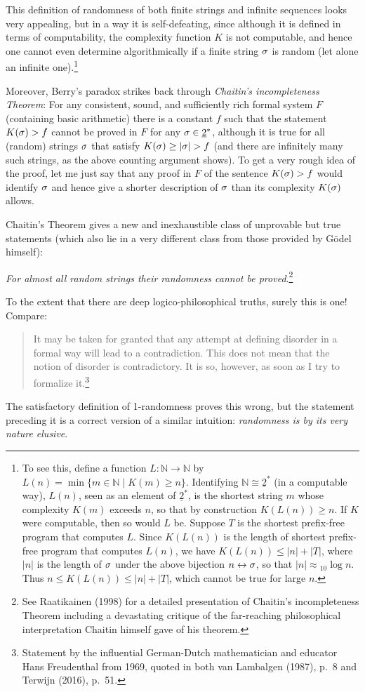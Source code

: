 \documentclass[11pt,a4paper]{article}
\numberwithin{equation}{section}
\newcommand{\ul}{\underline}
\newcommand{\raw}{\rightarrow}
\newcommand{\lraw}{\leftrightarrow}
\newcommand{\N}{{\mathbb N}} \newcommand{\R}{{\mathbb R}}
\begin{document}
This definition of randomness of both finite strings and infinite sequences looks very appealing, but in a way it is self-defeating, since although it is defined in terms of computability, the  complexity function $K$ is not computable, and hence one cannot even determine algorithmically if  a finite string $\sigma$ is random (let alone an infinite one).\footnote{To see this,  define a function $L:\N\raw\N$ by 
$L(n) = \min\{m\in\N \mid K(m) \geq n\}$. Identifying $\N\cong \ul{2}^*$ (in a computable way),
$L(n)$, seen as an element of $\ul{2}^*$,  is  the shortest string $m$ whose complexity $K(m)$ exceeds $n$, so that  by construction $K(L(n)) \geq n$.  If $K$ were  computable, then so would $L$ be. Suppose $T$ is the shortest prefix-free program  that computes $L$. 
Since $K(L(n))$ is the length of shortest prefix-free program that computes $L(n)$, we  have
  $K(L(n)) \leq |n| + |T|$, where $|n|$ is the length of $\sigma$ under the above bijection $n\lraw\sg$,
 so that $|n|\approx \mbox{}_{10}\!\log n$.
  Thus  $n\leq  K(L(n)) \leq |n| + |T|$, which cannot be true for large $n$.}
  
Moreover, Berry's paradox strikes back through \emph{Chaitin's incompleteness Theorem}: For any consistent, sound, and sufficiently rich formal system $F$ (containing basic arithmetic) there is a constant $f$ such that the statement $K(\sigma) > f$ cannot be proved in $F$ for any $\sg\in \ul{2}^*$, although it is true for  all (random)  strings $\sigma$ that satisfy $K(\sigma) \geq|\sigma| > f$ (and there are infinitely many such strings, as the above counting argument shows).
 To get a very rough idea of the proof, let me just say that 
any proof in $F$ of the sentence $K(\sigma) > f$  would  identify $\sigma$ and hence give a shorter description of $\sigma$ than its complexity $K(\sigma)$ allows.

Chaitin's Theorem gives a new and inexhaustible class of unprovable but true statements (which also lie in a very different class from those provided by G\"{o}del himself):
\begin{center}
\emph{For almost all random strings their randomness cannot be proved}.\footnote{See Raatikainen (1998) for a detailed presentation of Chaitin's incompleteness Theorem including a devastating critique of the far-reaching philosophical interpretation Chaitin himself gave of his theorem.}
\end{center}
To the extent that there are deep logico-philosophical truths, surely this is one! Compare: \begin{quote}\begin{small}
It may be taken for granted that any attempt at defining disorder in a formal way will lead to a contradiction. This does not mean that the notion of disorder is contradictory. It is so, however, as soon as I try to formalize it.\footnote{Statement by the influential German-Dutch mathematician and educator Hans Freudenthal from 1969, quoted in both van Lambalgen (1987), p.\ 8 and Terwijn (2016), p.\ 51.} 
\end{small}\end{quote}
The satisfactory definition of 1-randomness proves this wrong, but the  statement preceding it is a correct version of a similar  intuition: \emph{randomness is by its very nature elusive}.
\end{document}
